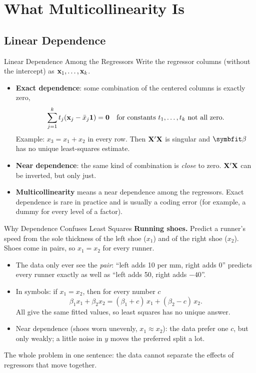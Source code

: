 \section{What Multicollinearity Is}


\subsection{Linear Dependence}


\begin{frame}{Linear Dependence Among the Regressors}
    Write the regressor columns (without the intercept) as $\mathbf{x}_1,\dots,\mathbf{x}_k$.
    \svspace{0.5em}
    \begin{itemize}
        \item \textbf{Exact dependence}: some combination of the centered columns is exactly zero,
        \[
        \sum_{j=1}^k t_j(\mathbf{x}_j-\bar x_j\mathbf{1})=\mathbf{0}\quad\text{for constants }t_1,\dots,t_k\text{ not all zero.}
        \]
        Example: $x_3=x_1+x_2$ in every row. Then $\mathbf{X}'\mathbf{X}$ is singular and $\bbeta$ has no unique least-squares estimate.
        \item \textbf{Near dependence}: the same kind of combination is \emph{close} to zero. $\mathbf{X}'\mathbf{X}$ can be inverted, but only just.
        \item \textbf{Multicollinearity} means a near dependence among the regressors. Exact dependence is rare in practice and is usually a coding error (for example, a dummy for every level of a factor).
    \end{itemize}
\end{frame}


\begin{frame}{Why Dependence Confuses Least Squares}
    \small
    \textbf{Running shoes.} Predict a runner's speed from the sole thickness of the left shoe ($x_1$) and of the right shoe ($x_2$). Shoes come in pairs, so $x_1=x_2$ for every runner.
    \begin{itemize}
        \item The data only ever see the \emph{pair}: ``left adds 10 per mm, right adds 0'' predicts every runner exactly as well as ``left adds 50, right adds $-40$''.
        \item In symbols: if $x_1=x_2$, then for every number $c$
        \[
        \beta_1x_1+\beta_2x_2=(\beta_1+c)\,x_1+(\beta_2-c)\,x_2 .
        \]
        All give the same fitted values, so least squares has no unique answer.
        \item Near dependence (shoes worn unevenly, $x_1\approx x_2$): the data prefer one $c$, but only weakly; a little noise in $y$ moves the preferred split a lot.
    \end{itemize}
    The whole problem in one sentence: the data cannot separate the effects of regressors that move together.
\end{frame}


